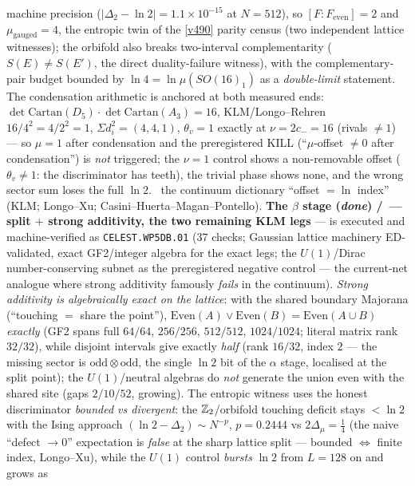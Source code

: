 machine precision ($|\Delta_2-\ln2|=1.1\times10^{-15}$ at $N{=}512$), so
$[F:F_{\mathrm{even}}]=2$ and $\mu_{\mathrm{gauged}}=4$, the entropic twin of the \vref{v490}
parity census (two independent lattice witnesses); the orbifold also breaks two-interval
complementarity ($S(E)\neq S(E')$, the direct duality-failure witness), with the complementary-pair
budget bounded by $\ln4=\ln\mu(SO(16)_1)$ as a \emph{double-limit} statement. The condensation
arithmetic is anchored at both measured ends: $\det\mathrm{Cartan}(D_5)\cdot\det\mathrm{Cartan}(A_3)
=16$, KLM/Longo--Rehren $16/4^2=4/2^2=1$, $\Sigma d_i^2=(4,4,1)$, $\theta_v=1$ exactly at
$\nu=2c_-=16$ (rivals $\neq1$) --- so $\mu=1$ after condensation and the preregistered KILL
(``$\mu$-offset $\neq0$ after condensation'') is \emph{not} triggered; the $\nu{=}1$ control shows a
non-removable offset ($\theta_v\neq1$: the discriminator has teeth), the trivial phase shows none,
and the wrong sector sum loses the full $\ln2$. \mC\ the continuum dictionary ``offset $=\ln$
index'' (KLM; Longo--Xu; Casini--Huerta--Magan--Pontello). \textbf{The $\beta$ stage (\emph{done})
\mE/\mC\ --- split $+$ strong additivity, the two remaining KLM legs} --- is executed and
machine-verified as \texttt{CELEST.WP5DB.01}
 ($37$ checks; Gaussian lattice machinery
ED-validated, exact GF2/integer algebra for the exact legs; the $U(1)$/Dirac number-conserving
subnet as the preregistered negative control --- the current-net analogue where strong additivity
famously \emph{fails} in the continuum). \emph{Strong additivity is algebraically exact on the
lattice}: with the shared boundary Majorana (``touching $=$ share the point''),
$\mathrm{Even}(A)\vee\mathrm{Even}(B)=\mathrm{Even}(A\cup B)$ \emph{exactly} (GF2 spans full
$64/64$, $256/256$, $512/512$, $1024/1024$; literal matrix rank $32/32$), while disjoint intervals
give exactly \emph{half} (rank $16/32$, index $2$ --- the missing sector is
$\mathrm{odd}\otimes\mathrm{odd}$, the single $\ln2$ bit of the $\alpha$ stage, localised at the
split point); the $U(1)$/neutral algebras do \emph{not} generate the union even with the shared site
(gaps $2/10/52$, growing). The entropic witness uses the honest discriminator \emph{bounded vs
divergent}: the $\mathbb Z_2$/orbifold touching deficit stays $<\ln2$ with the Ising approach
$(\ln2-\Delta_2)\sim N^{-p}$, $p=0.2444$ vs $2\Delta_\mu=\tfrac14$ (the naive ``defect $\to0$''
expectation is \emph{false} at the sharp lattice split --- bounded $\Leftrightarrow$ finite index,
Longo--Xu), while the $U(1)$ control \emph{bursts} $\ln2$ from $L=128$ on and grows as
